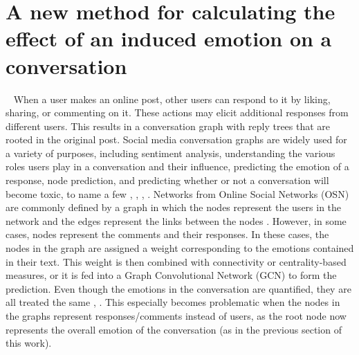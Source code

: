 \newpage 
\section{A new method for calculating the effect of an induced emotion on a conversation}~\label{sec:approach}
When a user makes an online post, other users can respond to it by liking, sharing, or commenting on it. These actions may elicit additional responses from different users. This results in a conversation graph with reply trees that are rooted in the original post. 
Social media conversation graphs are widely used for a variety of purposes, including sentiment analysis, understanding the various roles users play in a conversation and their influence, predicting the emotion of a response, node prediction, and predicting whether or not a conversation will become toxic, to name a few \cite{yang2022implicit}, \cite{zhao2020modeling}, \cite{yang2017social}, \cite{brambilla2021conversation}. Networks from Online Social Networks (OSN) are commonly defined by a graph in which the nodes represent the users in the network and the edges represent the links between the nodes \cite{antonakaki2021survey}. However, in some cases, nodes represent the comments and their responses. In these cases, the nodes in the graph are assigned a weight corresponding to the emotions contained in their text. This weight is then combined with connectivity or centrality-based measures, or it is fed into a Graph Convolutional Network (GCN) to form the prediction. Even though the emotions in the conversation are quantified, they are all treated the same \cite{perikos2018framework}, \cite{albadani2022transformer}. This especially becomes problematic when the nodes in the graphs represent responses/comments instead of users, as the root node now represents the overall emotion of the conversation (as in the previous section of this work). 
 

